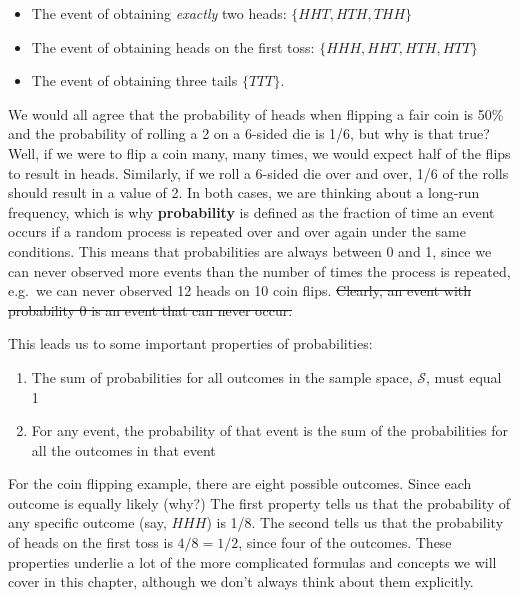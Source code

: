 \documentclass[
]{book}
\providecommand{\tightlist}{%
  \setlength{\itemsep}{0pt}\setlength{\parskip}{0pt}}
\theoremstyle{definition}
\theoremstyle{definition}
\theoremstyle{definition}
\theoremstyle{remark}
\begin{document}
\begin{itemize}
\tightlist
\item
  The event of obtaining \emph{exactly} two heads: \(\{HHT, HTH, THH\}\)\\
\item
  The event of obtaining heads on the first toss: \(\{HHH, HHT, HTH, HTT\}\)\\
\item
  The event of obtaining three tails \(\{TTT\}\).
\end{itemize}

We would all agree that the probability of heads when flipping a fair coin is 50\% and the probability of rolling a 2 on a 6-sided die is 1/6, but why is that true? Well, if we were to flip a coin many, many times, we would expect half of the flips to result in heads. Similarly, if we roll a 6-sided die over and over, 1/6 of the rolls should result in a value of 2. In both cases, we are thinking about a long-run frequency, which is why \textbf{probability} is defined as the fraction of time an event occurs if a random process is repeated over and over again under the same conditions. This means that probabilities are always between 0 and 1, since we can never observed more events than the number of times the process is repeated, e.g.~we can never observed 12 heads on 10 coin flips. \sout{Clearly, an event with probability 0 is an event that can never occur.}

This leads us to some important properties of probabilities:

\begin{enumerate}
\def\labelenumi{\arabic{enumi})}
\tightlist
\item
  The sum of probabilities for all outcomes in the sample space, \(\mathcal{S}\), must equal 1
\item
  For any event, the probability of that event is the sum of the probabilities for all the outcomes in that event
\end{enumerate}

For the coin flipping example, there are eight possible outcomes. Since each outcome is equally likely (why?) The first property tells us that the probability of any specific outcome (say, \(HHH\)) is 1/8. The second tells us that the probability of heads on the first toss is \(4/8 = 1/2\), since four of the outcomes. These properties underlie a lot of the more complicated formulas and concepts we will cover in this chapter, although we don't always think about them explicitly.
\end{document}
